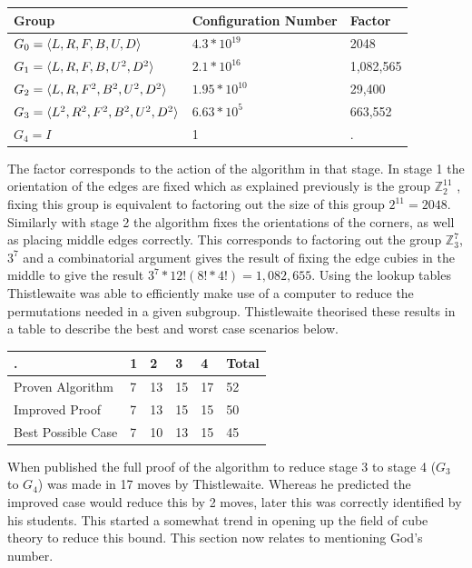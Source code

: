 \documentclass{article}
\DeclarePairedDelimiter{\opair}{\langle}{\rangle}
\newcounter{theo}[section]\setcounter{theo}{0}
\begin{document}
\begin{center}
\label{:thistletab}
    \begin{tabular}{ | p{6cm} | p{4cm}| p{3cm} |}
    \hline
    Group & Configuration Number & Factor \\ \hline
    $G_{0} = \opair{L,R,F,B,U,D}$ & $4.3*10^{19}$ & 2048\\ \hline
    $G_{1} = \opair{L,R,F,B,U^{2},D^{2}}$ &  $2.1*10^{16}$ & 1,082,565\\ \hline
    $G_{2} = \opair{L,R,F^{2},B^{2},U^{2},D^{2}}$& $1.95*10^{10}$ & 29,400 \\ \hline
    $G_{3} = \opair{L^{2},R^{2},F^{2},B^{2},U^{2},D^{2}}$& $6.63*10^{5}$ & 663,552\\ \hline
    $G_{4} = I$& 1 & .\\ \hline
    \end{tabular}
\end{center}
The factor corresponds to the action of the algorithm in that stage. In stage 1 the orientation of the edges are fixed which as explained previously is the group $\mathbb{Z}_{2}^{11}$ , fixing this group is equivalent to factoring out the size of this group $2^{11} = 2048$. Similarly with stage 2 the algorithm fixes the orientations of the corners, as well as placing middle edges correctly. This corresponds to factoring out the group $\mathbb{Z}_{3}^{7}$, $3^7$  and a combinatorial argument gives the result of fixing the edge cubies in the middle to give the result $3^7 * 12!(8!*4!) = 1,082,655$. Using the lookup tables Thistlewaite was able to efficiently make use of a computer to reduce the permutations needed in a given subgroup. Thistlewaite theorised these results in a table to describe the best and worst case scenarios below.
\begin{center}
\label{:thistletab}
    \begin{tabular}{ | p{4cm}| p{1.5cm}| p{1.5cm}| p{1.5cm}| p{1.5cm}| p{2cm}|}
    \hline
    . & 1 & 2 & 3 & 4 & Total \\ \hline
    Proven Algorithm & 7 & 13 & 15 & 17 & 52\\ \hline
	Improved Proof & 7 & 13 &15 & 15 & 50\\ \hline
	Best Possible Case & 7 & 10 & 13 & 15 &45\\ \hline
    \end{tabular}
\end{center}
When published the full proof of the algorithm to reduce stage 3 to stage 4 ($G_3$ to $G_4$) was made in 17 moves by Thistlewaite. Whereas he predicted the improved case would reduce this by 2 moves, later this was correctly identified by his students. This started a somewhat trend in opening up the field of cube theory to reduce this bound. This section now relates to mentioning God's number.
\end{document}
